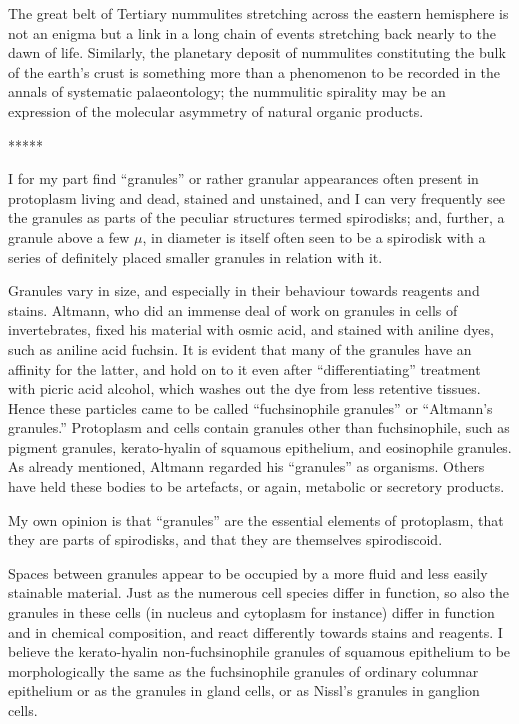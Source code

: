 \documentclass[a4paper, 12pt, oneside]{article}
\begin{document}
The great belt of Tertiary nummulites stretching across the eastern hemisphere is not an enigma but a link in a long chain of events stretching back nearly to the dawn of life. Similarly, the planetary deposit of nummulites constituting the bulk of the earth's crust is something more than a phenomenon to be recorded in the annals of systematic palaeontology; the nummulitic spirality may be an expression of the molecular asymmetry of natural organic products.

\centerline{*\hspace{15mm}*\hspace{15mm}*\hspace{15mm}*\hspace{15mm}*}
\bigskip

I for my part find ``granules'' or rather granular appearances often present in protoplasm living and dead, stained and unstained, and I can very frequently see the granules as parts of the peculiar structures termed spirodisks; and, further, a granule above a few $\mu$, in diameter is itself often seen to be a spirodisk with a series of definitely placed smaller granules in relation with it.

Granules vary in size, and especially in their behaviour towards reagents and stains. Altmann, who did an immense deal of work on granules in cells of invertebrates, fixed his material with osmic acid, and stained with aniline dyes, such as aniline acid fuchsin. It is evident that many of the granules have an affinity for the latter, and hold on to it even after ``differentiating'' treatment with picric acid alcohol, which washes out the dye from less retentive tissues. Hence these particles came to be called ``fuchsinophile granules'' or ``Altmann's granules.'' Protoplasm and cells contain granules other than fuchsinophile, such as pigment granules, kerato-hyalin of squamous epithelium, and eosinophile granules. As already mentioned, Altmann regarded his ``granules'' as organisms. Others have held these bodies to be artefacts, or again, metabolic or secretory products.

My own opinion is that ``granules'' are the essential elements of protoplasm, that they are parts of spirodisks, and that they are themselves spirodiscoid.

Spaces between granules appear to be occupied by a more fluid and less easily stainable material. Just as the numerous cell species differ in function, so also the granules in these cells (in nucleus and cytoplasm for instance) differ in function and in chemical composition, and react differently towards stains and reagents. I believe the kerato-hyalin non-fuchsinophile granules of squamous epithelium to be morphologically the same as the fuchsinophile granules of ordinary columnar epithelium or as the granules in gland cells, or as Nissl's granules in ganglion cells.
\end{document}
